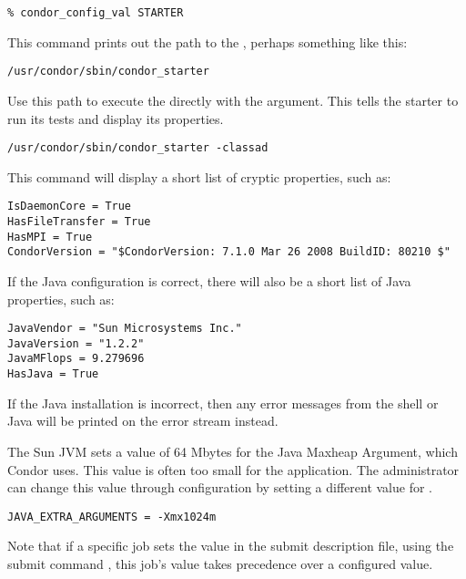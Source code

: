 \begin{verbatim}
% condor_config_val STARTER
\end{verbatim}

This command prints out the path to the ,
perhaps something like this:

\begin{verbatim}
/usr/condor/sbin/condor_starter
\end{verbatim}

Use this path to execute the  directly
with the  argument.
This tells the starter to run its tests and display its properties.

\begin{verbatim}
/usr/condor/sbin/condor_starter -classad
\end{verbatim}

This command will display a short list of cryptic properties, such as:

\begin{verbatim}
IsDaemonCore = True
HasFileTransfer = True
HasMPI = True
CondorVersion = "$CondorVersion: 7.1.0 Mar 26 2008 BuildID: 80210 $"
\end{verbatim}

If the Java configuration is correct, there will also
be a short list of Java properties, such as:

\begin{verbatim}
JavaVendor = "Sun Microsystems Inc."
JavaVersion = "1.2.2"
JavaMFlops = 9.279696
HasJava = True
\end{verbatim}

If the Java installation is incorrect, then any error
messages from the shell or Java will be printed
on the error stream instead.

The Sun JVM sets a value of 64 Mbytes for the Java Maxheap Argument,
which Condor uses.
This value is often too small for the application.
The administrator can change this value through configuration by setting
a different value for .

\footnotesize
\begin{verbatim}
JAVA_EXTRA_ARGUMENTS = -Xmx1024m
\end{verbatim}
\normalsize
Note that if a specific job sets the value in the submit description
file, using the submit command ,
this job's value takes precedence over a configured value.


